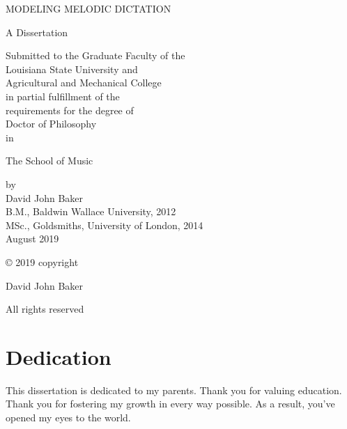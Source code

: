 \documentclass[12pt,]{book}
\title{}
\author{}
\date{2019-06-05}
\begin{document}
\thispagestyle{empty}
\begin{center}
MODELING MELODIC DICTATION\\
\end{center}

\begin{center}
A Dissertation

Submitted to the Graduate Faculty of the\\
Louisiana State University and\\
Agricultural and Mechanical College\\
in partial fulfillment of the\\
requirements for the degree of\\
Doctor of Philosophy\\

in

The School of Music
\end{center}

\begin{center}
by\\
David John Baker\\
B.M., Baldwin Wallace University, 2012\\
MSc., Goldsmiths, University of London, 2014\\
August 2019\\
\end{center}


\setlength{\abovedisplayskip}{-5pt}
\setlength{\abovedisplayshortskip}{-5pt}


\newpage

\thispagestyle{plain}

© 2019 copyright

David John Baker

All rights reserved


\let\cleardoublepage\clearpage
\pagestyle{empty}
\chapter{Dedication}

This dissertation is dedicated to my parents.
Thank you for valuing education.
Thank you for fostering my growth in every way possible.
As a result, you've opened my eyes to the world.
\end{document}
